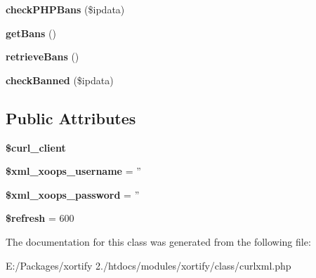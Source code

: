 \begin{DoxyCompactItemize}
\item 
\hypertarget{class_c_u_r_l_x_m_l_xortify_exchange_a1d5d2753c5259c572ea6ded19fced6f5}{{\bfseries check\-P\-H\-P\-Bans} (\$ipdata)}\label{class_c_u_r_l_x_m_l_xortify_exchange_a1d5d2753c5259c572ea6ded19fced6f5}

\item 
\hypertarget{class_c_u_r_l_x_m_l_xortify_exchange_ab4614d34ca9a0546a1885d407137cd22}{{\bfseries get\-Bans} ()}\label{class_c_u_r_l_x_m_l_xortify_exchange_ab4614d34ca9a0546a1885d407137cd22}

\item 
\hypertarget{class_c_u_r_l_x_m_l_xortify_exchange_ac5d062cd907b0b9230a3a7fb7a71cf41}{{\bfseries retrieve\-Bans} ()}\label{class_c_u_r_l_x_m_l_xortify_exchange_ac5d062cd907b0b9230a3a7fb7a71cf41}

\item 
\hypertarget{class_c_u_r_l_x_m_l_xortify_exchange_ae706dddc27baaa3eb21ac2e9417e7760}{{\bfseries check\-Banned} (\$ipdata)}\label{class_c_u_r_l_x_m_l_xortify_exchange_ae706dddc27baaa3eb21ac2e9417e7760}

\end{DoxyCompactItemize}
\subsection*{Public Attributes}
\begin{DoxyCompactItemize}
\item 
\hypertarget{class_c_u_r_l_x_m_l_xortify_exchange_a0f42b7cba3cc6e6acb3da741c2cede43}{{\bfseries \$curl\-\_\-client}}\label{class_c_u_r_l_x_m_l_xortify_exchange_a0f42b7cba3cc6e6acb3da741c2cede43}

\item 
\hypertarget{class_c_u_r_l_x_m_l_xortify_exchange_a53b360bc4ca889c1054eae6564d3b724}{{\bfseries \$xml\-\_\-xoops\-\_\-username} = ''}\label{class_c_u_r_l_x_m_l_xortify_exchange_a53b360bc4ca889c1054eae6564d3b724}

\item 
\hypertarget{class_c_u_r_l_x_m_l_xortify_exchange_a2cd313925dbe3fa47ef66f42a675aded}{{\bfseries \$xml\-\_\-xoops\-\_\-password} = ''}\label{class_c_u_r_l_x_m_l_xortify_exchange_a2cd313925dbe3fa47ef66f42a675aded}

\item 
\hypertarget{class_c_u_r_l_x_m_l_xortify_exchange_af2a143728186f473b2cc63b0dcec59d8}{{\bfseries \$refresh} = 600}\label{class_c_u_r_l_x_m_l_xortify_exchange_af2a143728186f473b2cc63b0dcec59d8}

\end{DoxyCompactItemize}


The documentation for this class was generated from the following file\-:\begin{DoxyCompactItemize}
\item 
E\-:/\-Packages/xortify 2./htdocs/modules/xortify/class/curlxml.\-php\end{DoxyCompactItemize}
